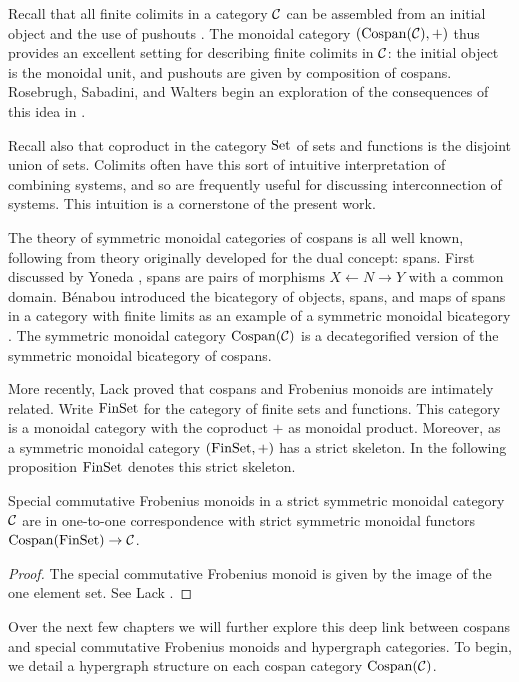 \begin{remark}
  Recall that all finite colimits in a category $\mathcal C$ can be assembled from an
  initial object and the use of pushouts \cite{Mac98}. The monoidal category
  $(\operatorname{{Cospan}}(\mathcal C),+)$ thus provides an excellent setting for describing finite
  colimits in $\mathcal C$: the initial object is the monoidal unit, and pushouts are
  given by composition of cospans. Rosebrugh, Sabadini, and Walters begin an
  exploration of the consequences of this idea in \cite{RSW08}.
  
  Recall also that coproduct in the category $\mathrm{Set}$ of sets and functions is the
  disjoint union of sets. Colimits often have this sort of intuitive
  interpretation of combining systems, and so are frequently useful for
  discussing interconnection of systems. This intuition is a cornerstone of the
  present work.
\end{remark}

The theory of symmetric monoidal categories of cospans is all well known,
following from theory originally developed for the dual concept: spans. First
discussed by Yoneda \cite{Yon54}, spans are pairs of morphisms $X \leftarrow N
\rightarrow Y$ with a common domain. B\'enabou introduced the bicategory of
objects, spans, and maps of spans in a category with finite limits as an example
of a symmetric monoidal bicategory \cite{Ben67}. The symmetric monoidal category
$\operatorname{{Cospan}}(\mathcal C)$ is a decategorified version of the symmetric monoidal bicategory of
cospans. 

More recently, Lack proved that cospans and Frobenius monoids are intimately
related. Write $\mathrm{FinSet}$ for the category of finite sets and functions. This
category is a monoidal category with the coproduct $+$ as monoidal product.
Moreover, as a symmetric monoidal category $(\mathrm{FinSet},+)$ has a strict skeleton.
In the following proposition $\mathrm{FinSet}$ denotes this strict skeleton.

\begin{proposition} \label{prop.cospanscfm}
  Special commutative Frobenius monoids in a strict symmetric monoidal category
  $\mathcal C$ are in one-to-one correspondence with strict symmetric monoidal functors
  $\operatorname{{Cospan}}(\mathrm{FinSet}) \to \mathcal C$.
\end{proposition}
\begin{proof}
  The special commutative Frobenius monoid is given by the image of the one
  element set. See Lack \cite{Lac04}.
\end{proof}

Over the next few chapters we will further explore this deep link between
cospans and special commutative Frobenius monoids and hypergraph categories.
To begin, we detail a hypergraph structure on each cospan category $\operatorname{{Cospan}}(\mathcal
C)$. 

